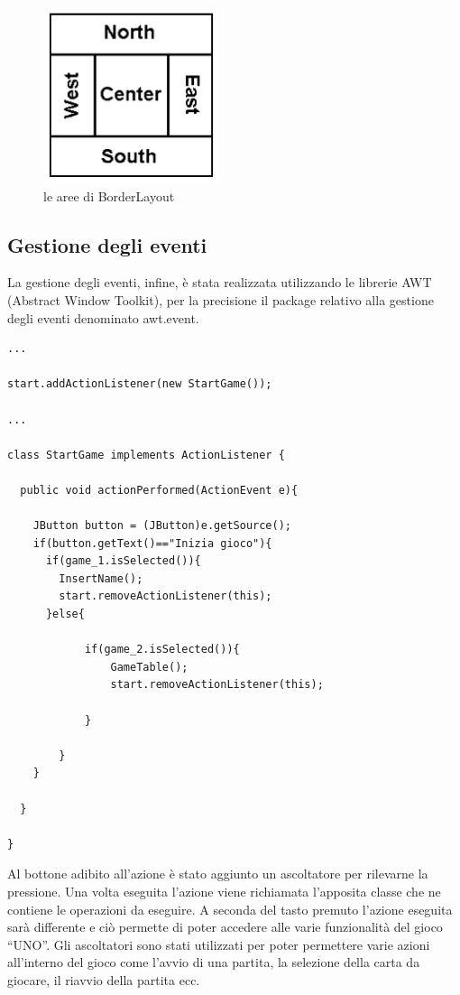 			\begin{figure}[h]
				\centering
				\includegraphics[scale=0.6]{3.png}
				\caption{le aree di BorderLayout}
				\label{fig3}
			\end{figure}
				
	\subsection{Gestione degli eventi}
		La gestione degli eventi, infine, è stata realizzata utilizzando le librerie AWT (Abstract Window Toolkit), per la precisione il package relativo alla gestione degli eventi denominato awt.event. 
\begin{lstlisting}
...

start.addActionListener(new StartGame());

...

class StartGame implements ActionListener {
		
  public void actionPerformed(ActionEvent e){
	
    JButton button = (JButton)e.getSource();
    if(button.getText()=="Inizia gioco"){
	  if(game_1.isSelected()){
		InsertName();
		start.removeActionListener(this);
	  }else{
		
			if(game_2.isSelected()){
				GameTable();
				start.removeActionListener(this);
			
			}
		
		}
    }
	
  }

}

\end{lstlisting}

		Al bottone adibito all'azione è stato aggiunto un ascoltatore per rilevarne la pressione. Una volta eseguita l'azione viene richiamata l'apposita classe che ne contiene le operazioni da eseguire. A seconda del tasto premuto l'azione eseguita sarà differente e ciò permette di poter accedere alle varie funzionalità del gioco “UNO”. Gli ascoltatori sono stati utilizzati per poter permettere varie azioni all’interno del gioco come l’avvio di una partita, la selezione della carta da giocare, il riavvio della partita ecc.
		
